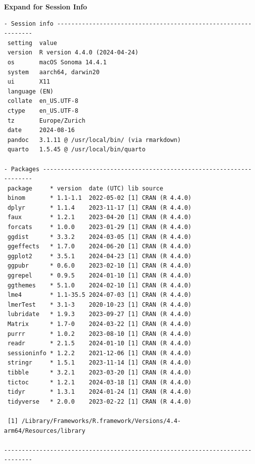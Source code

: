 \documentclass[
  letterpaper,
  DIV=11,
  numbers=noendperiod]{scrartcl}
\begin{document}
\begin{tcolorbox}[enhanced jigsaw, arc=.35mm, leftrule=.75mm, opacityback=0, colframe=quarto-callout-note-color-frame, breakable, rightrule=.15mm, toprule=.15mm, left=2mm, colback=white, bottomrule=.15mm]
\begin{minipage}[t]{5.5mm}
\textcolor{quarto-callout-note-color}{\faInfo}
\end{minipage}%
\begin{minipage}[t]{\textwidth - 5.5mm}

\vspace{-3mm}\textbf{Expand for Session Info}\vspace{3mm}

\begin{verbatim}
- Session info ---------------------------------------------------------------
 setting  value
 version  R version 4.4.0 (2024-04-24)
 os       macOS Sonoma 14.4.1
 system   aarch64, darwin20
 ui       X11
 language (EN)
 collate  en_US.UTF-8
 ctype    en_US.UTF-8
 tz       Europe/Zurich
 date     2024-08-16
 pandoc   3.1.11 @ /usr/local/bin/ (via rmarkdown)
 quarto   1.5.45 @ /usr/local/bin/quarto

- Packages -------------------------------------------------------------------
 package     * version  date (UTC) lib source
 binom       * 1.1-1.1  2022-05-02 [1] CRAN (R 4.4.0)
 dplyr       * 1.1.4    2023-11-17 [1] CRAN (R 4.4.0)
 faux        * 1.2.1    2023-04-20 [1] CRAN (R 4.4.0)
 forcats     * 1.0.0    2023-01-29 [1] CRAN (R 4.4.0)
 ggdist      * 3.3.2    2024-03-05 [1] CRAN (R 4.4.0)
 ggeffects   * 1.7.0    2024-06-20 [1] CRAN (R 4.4.0)
 ggplot2     * 3.5.1    2024-04-23 [1] CRAN (R 4.4.0)
 ggpubr      * 0.6.0    2023-02-10 [1] CRAN (R 4.4.0)
 ggrepel     * 0.9.5    2024-01-10 [1] CRAN (R 4.4.0)
 ggthemes    * 5.1.0    2024-02-10 [1] CRAN (R 4.4.0)
 lme4        * 1.1-35.5 2024-07-03 [1] CRAN (R 4.4.0)
 lmerTest    * 3.1-3    2020-10-23 [1] CRAN (R 4.4.0)
 lubridate   * 1.9.3    2023-09-27 [1] CRAN (R 4.4.0)
 Matrix      * 1.7-0    2024-03-22 [1] CRAN (R 4.4.0)
 purrr       * 1.0.2    2023-08-10 [1] CRAN (R 4.4.0)
 readr       * 2.1.5    2024-01-10 [1] CRAN (R 4.4.0)
 sessioninfo * 1.2.2    2021-12-06 [1] CRAN (R 4.4.0)
 stringr     * 1.5.1    2023-11-14 [1] CRAN (R 4.4.0)
 tibble      * 3.2.1    2023-03-20 [1] CRAN (R 4.4.0)
 tictoc      * 1.2.1    2024-03-18 [1] CRAN (R 4.4.0)
 tidyr       * 1.3.1    2024-01-24 [1] CRAN (R 4.4.0)
 tidyverse   * 2.0.0    2023-02-22 [1] CRAN (R 4.4.0)

 [1] /Library/Frameworks/R.framework/Versions/4.4-arm64/Resources/library

------------------------------------------------------------------------------
\end{verbatim}

\end{minipage}%
\end{tcolorbox}
\end{document}
